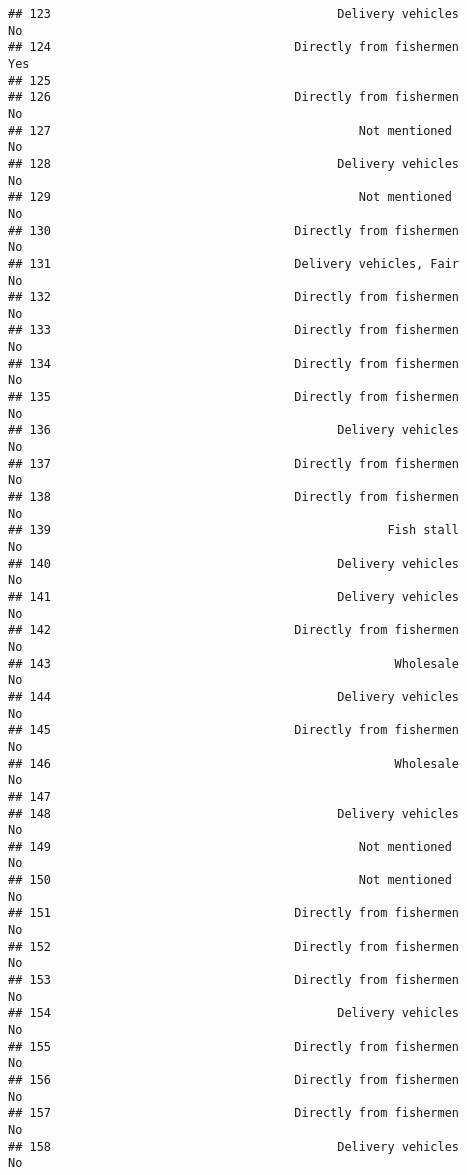 \documentclass[
]{article}
\begin{document}
\begin{verbatim}
## 123                                        Delivery vehicles        No
## 124                                  Directly from fishermen       Yes
## 125                                                                   
## 126                                  Directly from fishermen        No
## 127                                           Not mentioned         No
## 128                                        Delivery vehicles        No
## 129                                           Not mentioned         No
## 130                                  Directly from fishermen        No
## 131                                  Delivery vehicles, Fair        No
## 132                                  Directly from fishermen        No
## 133                                  Directly from fishermen        No
## 134                                  Directly from fishermen        No
## 135                                  Directly from fishermen        No
## 136                                        Delivery vehicles        No
## 137                                  Directly from fishermen        No
## 138                                  Directly from fishermen        No
## 139                                               Fish stall        No
## 140                                        Delivery vehicles        No
## 141                                        Delivery vehicles        No
## 142                                  Directly from fishermen        No
## 143                                                Wholesale        No
## 144                                        Delivery vehicles        No
## 145                                  Directly from fishermen        No
## 146                                                Wholesale        No
## 147                                                                   
## 148                                        Delivery vehicles        No
## 149                                           Not mentioned         No
## 150                                           Not mentioned         No
## 151                                  Directly from fishermen        No
## 152                                  Directly from fishermen        No
## 153                                  Directly from fishermen        No
## 154                                        Delivery vehicles        No
## 155                                  Directly from fishermen        No
## 156                                  Directly from fishermen        No
## 157                                  Directly from fishermen        No
## 158                                        Delivery vehicles        No

\end{verbatim}
\end{document}
